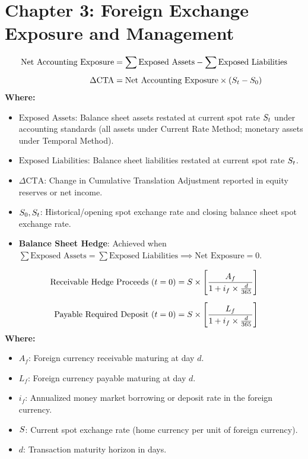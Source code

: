 \section*{Chapter 3: Foreign Exchange Exposure and Management}

\begin{formulabox}
\begin{align*}
    \text{Net Accounting Exposure} &= \sum \text{Exposed Assets} - \sum \text{Exposed Liabilities} \\[0.4em]
    \Delta \text{CTA} &= \text{Net Accounting Exposure} \times (S_t - S_0)
\end{align*}
\textbf{Where:}
\begin{itemize}[leftmargin=*, noitemsep]
    \item $\text{Exposed Assets}$: Balance sheet assets restated at current spot rate $S_t$ under accounting standards (all assets under Current Rate Method; monetary assets under Temporal Method).
    \item $\text{Exposed Liabilities}$: Balance sheet liabilities restated at current spot rate $S_t$.
    \item $\Delta \text{CTA}$: Change in Cumulative Translation Adjustment reported in equity reserves or net income.
    \item $S_0, S_t$: Historical/opening spot exchange rate and closing balance sheet spot exchange rate.
    \item \textbf{Balance Sheet Hedge}: Achieved when $\sum \text{Exposed Assets} = \sum \text{Exposed Liabilities} \implies \text{Net Exposure} = 0$.
\end{itemize}
\end{formulabox}

\begin{formulabox}
\begin{align*}
    \text{Receivable Hedge Proceeds ($t=0$)} &= S \times \left[ \frac{A_f}{1 + i_f \times \frac{d}{365}} \right] \\[0.5em]
    \text{Payable Required Deposit ($t=0$)} &= S \times \left[ \frac{L_f}{1 + i_f \times \frac{d}{365}} \right]
\end{align*}
\textbf{Where:}
\begin{itemize}[leftmargin=*, noitemsep]
    \item $A_f$: Foreign currency receivable maturing at day $d$.
    \item $L_f$: Foreign currency payable maturing at day $d$.
    \item $i_f$: Annualized money market borrowing or deposit rate in the foreign currency.
    \item $S$: Current spot exchange rate (home currency per unit of foreign currency).
    \item $d$: Transaction maturity horizon in days.
\end{itemize}
\end{formulabox}


